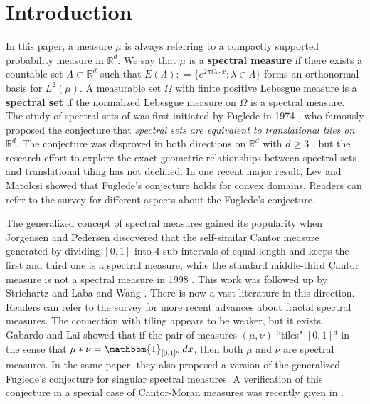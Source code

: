 \documentclass[12pt,a4paper,oneside]{amsart}
\theoremstyle{definition}
\newcommand{\RR}{{\mathbb R}}
\newcommand{\one}{{\mathbbm{1}}}
\begin{document}
\section{Introduction}\label{s:intro}

In this paper, a measure $\mu$ is always referring to a compactly supported probability measure in $\RR^d$.  We say that $\mu$ is a {\bf spectral measure} if there exists a countable set $\Lambda\subset \RR^d$ such that $E(\Lambda): = \{e^{2\pi i \lambda \cdot x}: \lambda\in\Lambda\}$ forms an orthonormal basis for $L^2(\mu)$. A measurable set $\Omega$ with finite positive Lebesgue measure is a {\bf spectral set} if the normalized Lebesgue measure on $\Omega$ is a spectral measure. The study of spectral sets of was first initiated by Fuglede in 1974 \cite{fuglede1974operators}, who famously proposed the conjecture that {\it spectral sets are equivalent to translational tiles on $\RR^d$}. The conjecture was disproved in both directions on $\RR^d$ with $d\ge 3$ \cite{tao2004fuglede,kolountzakis2006tiles,kolountzakis2006hadamard,farkas2006onfuglede,farkas2006tiles}, but the research effort to explore the exact geometric relationships between spectral sets and translational tiling has not declined. {In one recent major result,} Lev and Matolcsi \cite{lev2022fuglede} showed that Fuglede's conjecture holds for convex domains.  Readers can refer to the survey \cite{kolountzakis2024orthogonal} for different aspects about the Fuglede's conjecture.  

The generalized concept of spectral measures gained its popularity when Jorgensen and Pedersen discovered that {the  self-similar Cantor measure generated by dividing $[0,1]$ into 4 sub-intervals of equal length and keeps the first and third one is a spectral measure}, while the standard middle-third Cantor measure is not a spectral measure in 1998 \cite{jorgensen1998dense}. This work was followed up by Strichartz \cite{strichartz2000mock} and {\L}aba and Wang \cite{laba2002spectral-cantor}.  There {is now a vast} literature in this direction.  Readers can refer to the survey \cite{DLW17} for more recent advances about fractal spectral measures.  The connection with tiling appears to be weaker, but it exists. Gabardo and Lai \cite{GL14} showed that if the pair of measures  $(\mu,\nu)$ ``tiles" $[0,1]{^d}$ in the sense that $\mu\ast \nu = {\one_{[0,1]^d}\,dx}$, then both $\mu$ and $\nu$ are spectral measures. In the same paper, they also proposed a version of the generalized Fuglede's conjecture for singular spectral measures. A verification of {this conjecture in} a special case of Cantor-Moran measures was recently given in \cite{ALZ25}.
\end{document}
